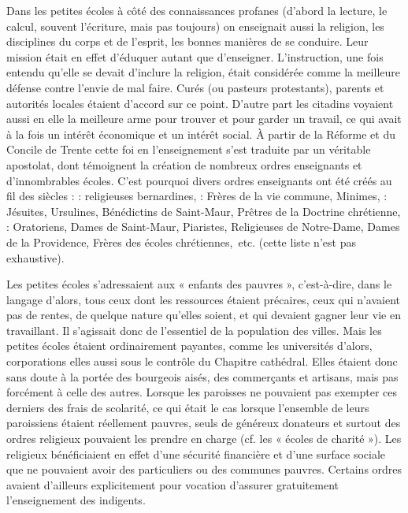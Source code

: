 Dans les petites écoles à côté des connaissances profanes (d'abord la lecture, le calcul, souvent l'écriture, mais pas toujours) on enseignait aussi la religion, les disciplines du corps et de l'esprit, les bonnes manières de se conduire. Leur mission était en effet d'éduquer autant que d'enseigner. L'instruction, une fois entendu qu'elle se devait d'inclure la religion, était considérée comme la meilleure défense contre l'envie de mal faire. Curés (ou pasteurs protestants), parents et autorités locales étaient d'accord sur ce point. D'autre part les citadins voyaient aussi en elle la meilleure arme pour trouver et pour garder un travail, ce qui avait à la fois un intérêt économique et un intérêt social. À partir de la Réforme et du Concile de Trente cette foi en l'enseignement s'est traduite par un véritable apostolat, dont témoignent la création de nombreux ordres enseignants et d'innombrables écoles. C'est pourquoi divers ordres enseignants ont été créés au fil des siècles :
 : religieuses bernardines,
 : Frères de la vie commune, Minimes,
 : Jésuites, Ursulines, Bénédictins de Saint-Maur, Prêtres de la Doctrine chrétienne,
 : Oratoriens, Dames de Saint-Maur, Piaristes, Religieuses de Notre-Dame, Dames de la Providence, Frères des écoles chrétiennes,~etc. (cette liste n'est pas exhaustive).

 Les petites écoles s'adressaient aux « enfants des pauvres », c'est-à-dire, dans le langage d'alors, tous ceux dont les ressources étaient précaires, ceux qui n'avaient pas de rentes, de quelque nature qu'elles soient, et qui devaient gagner leur vie en travaillant. Il s'agissait donc de l'essentiel de la population des villes. Mais les petites écoles étaient ordinairement payantes, comme les universités d'alors, corporations elles aussi sous le contrôle du Chapitre cathédral. Elles étaient donc sans doute à la portée des bourgeois aisés, des commerçants et artisans, mais pas forcément à celle des autres. Lorsque les paroisses ne pouvaient pas exempter ces derniers des frais de scolarité, ce qui était le cas lorsque l'ensemble de leurs paroissiens étaient réellement pauvres, seuls de généreux donateurs et surtout des ordres religieux pouvaient les prendre en charge (cf.  les « écoles de charité »). Les religieux bénéficiaient en effet d'une sécurité financière et d'une surface sociale que ne pouvaient avoir des particuliers ou des communes pauvres. Certains ordres avaient d'ailleurs explicitement pour vocation d'assurer gratuitement l'enseignement des indigents.

